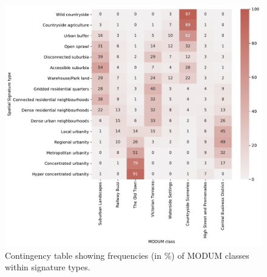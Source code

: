 \begin{figure}
    \centering
    \includegraphics[width=.8\linewidth]{fig/crosstab_modum.pdf}
    \caption{Contingency table showing frequencies (in \%) of MODUM classes within signature types.}
    \label{fig:crosstab_modum}
\end{figure}


